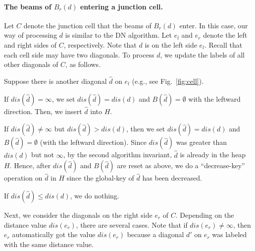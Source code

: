 \documentclass[english,runningheads,11pt]{llncs-revised}
\def\hatd{\hat{d}}
\begin{document}
\paragraph{The beams of $B_r(d)$ entering a junction cell.}
Let $C$ denote the junction cell that the beams of $B_r(d)$ enter.
In this case, our way of processing $d$ is similar to
the DN algorithm. Let $e_l$ and $e_r$ denote the left and
right sides of $C$, respectively. Note that $d$ is on the left side
$e_l$. Recall that each cell side may have two diagonals. To process
$d$, we update the labels of all other diagonals of $C$, as
follows.

Suppose there is another diagonal $\hatd$ on $e_l$ (e.g., see Fig.~\ref{fig:cell}).

If $dis(\hatd)=\infty$, we set $dis(\hatd)=dis(d)$ and
$B(\hatd)=\emptyset$ with the leftward direction. Then, we insert $\hatd$ into
$H$.

If $dis(\hatd)\neq \infty$ but $dis(\hatd)>dis(d)$, then we set
$dis(\hatd)=dis(d)$ and $B(\hatd)=\emptyset$ (with the leftward direction).
Since $dis(\hatd)$ was greater than $dis(d)$ but not $\infty$, by the second algorithm invariant,
$\hatd$ is already in the heap $H$.
Hence, after $dis(\hatd)$ and $B(\hatd)$  are reset as above, we do
a ``decrease-key'' operation on $\hatd$ in $H$ since the global-key of $\hatd$ has been decreased.

If $dis(\hatd)\leq dis(d)$, we do nothing.


Next, we consider the diagonals on the right side $e_r$ of $C$. Depending on the
distance value $dis(e_r)$, there are several cases. Note that if
$dis(e_r)\neq \infty$, then
$e_r$ automatically got the value $dis(e_r)$ because a diagonal $d'$ on
$e_r$ was labeled with the same distance value.
\end{document}
